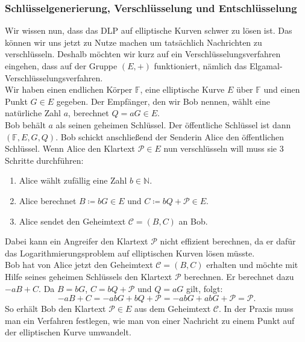 \documentclass[hidelinks]{article}
\theoremstyle{plain}
\theoremstyle{definition}
\theoremstyle{rem}
\begin{document}
\begin{sloppypar}
\subsubsection{Schlüsselgenerierung, Verschlüsselung und Entschlüsselung}
Wir wissen nun, dass das DLP auf elliptische Kurven schwer zu lösen ist. Das können wir uns jetzt zu Nutze machen um tatsächlich Nachrichten zu verschlüsseln. Deshalb möchten wir kurz auf ein Verschlüsselungsverfahren eingehen, dass auf der Gruppe $(E, +)$ funktioniert, nämlich das Elgamal-Verschlüsselungsverfahren. \\
\newline
Wir haben einen endlichen Körper $\mathbb{F}$, eine elliptische Kurve $E$ über $\mathbb{F}$ und einen Punkt $G \in E$ gegeben. Der Empfänger, den wir Bob nennen, wählt eine natürliche Zahl $a$, berechnet $Q = aG \in E$. \\
Bob behält $a$ als seinen geheimen Schlüssel. Der öffentliche Schlüssel ist dann $(\mathbb{F}, E, G, Q)$. Bob schickt anschließend der Senderin Alice den öffentlichen Schlüssel. Wenn Alice den Klartext $\mathcal{P} \in E$ nun verschlüsseln will muss sie 3 Schritte durchführen:
\begin{enumerate}
    \item Alice wählt zufällig eine Zahl $b \in \mathbb{N}$.
    \item Alice berechnet $B \coloneqq bG \in E$ und $C \coloneqq bQ + \mathcal{P} \in E$.
    \item Alice sendet den Geheimtext $\mathcal{C} = (B,C)$ an Bob.
\end{enumerate}
Dabei kann ein Angreifer den Klartext $\mathcal{P}$ nicht effizient berechnen, da er dafür das Logarithmierungsproblem auf elliptischen Kurven lösen müsste. \\
\newline
Bob hat von Alice jetzt den Geheimtext $\mathcal{C} = (B,C)$ erhalten und möchte mit Hilfe seines geheimen Schlüssels den Klartext $\mathcal{P}$ berechnen. Er berechnet dazu $-aB + C$. 
Da $B=bG$, $C=bQ + \mathcal{P}$ und $Q = aG$ gilt, folgt:
\begin{equation*}
    -aB + C = -abG + bQ + \mathcal{P} = -abG + abG + \mathcal{P} = \mathcal{P}.
\end{equation*}
So erhält Bob den Klartext $\mathcal{P} \in E$ aus dem Geheimtext $\mathcal{C}$. In der Praxis muss man ein Verfahren festlegen, wie man von einer Nachricht zu einem Punkt auf der elliptischen Kurve umwandelt.

\end{sloppypar}
\end{document}
